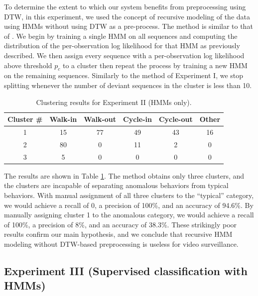 To determine the extent to which our system benefits from
preprocessing using DTW, in this experiment, we used the concept of
recursive modeling of the data using HMMs without using DTW as a
pre-process.  The method is similar to that
of .  We begin by training a single HMM
on all sequences and computing the distribution of the per-observation
log likelihood for that HMM as previously described.  We then assign
every sequence with a per-observation log likelihood above threshold
$p_c$ to a cluster then repeat the process by training a new HMM on
the remaining sequences.  Similarly to the method of Experiment I, we
stop splitting whenever the number of deviant sequences in the cluster
is less than 10.

\begin{table}[t]
  \caption[Clustering results for Experiment II (HMMs only).]{\small
    Clustering results for Experiment II (HMMs only).}
  \label{tab:hmm-assoc-matrix}
  \begin{center}
    \begin{tabular}{c|c|c|c|c|c}
      \hline
      Cluster \# & Walk-in & Walk-out & Cycle-in & Cycle-out & Other \\ 
      \hline \hline
      1 & 15 & 77 & 49 & 43 & 16 \\ \hline
      2 & 80 & 0 & 11 & 2 & 0 \\ \hline	
      3 & 5 & 0 & 0 & 0 & 0 \\ \hline	
    \end{tabular}
  \end{center}
\end{table}

The results are shown in Table \ref{tab:hmm-assoc-matrix}. The method
obtains only three clusters, and the clusters are incapable of
separating anomalous behaviors from typical behaviors.  With manual
assignment of all three clusters to the ``typical'' category, we would
achieve a recall of 0, a precision of 100\%, and an accuracy of
94.6\%.  By manually assigning cluster 1 to the anomalous category, we
would achieve a recall of 100\%, a precision of 8\%, and an accuracy
of 38.3\%.  These strikingly poor results confirm our main hypothesis,
and we conclude that recursive HMM modeling without DTW-based
preprocessing is useless for video surveillance.

\subsection{Experiment III (Supervised classification with HMMs)} 

